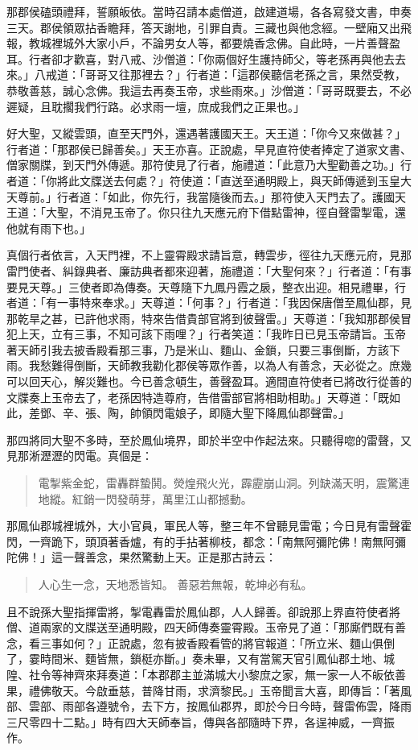 那郡侯磕頭禮拜，誓願皈依。當時召請本處僧道，啟建道場，各各寫發文書，申奏三天。郡侯領眾拈香瞻拜，答天謝地，引罪自責。三藏也與他念經。一壁廂又出飛報，教城裡城外大家小戶，不論男女人等，都要燒香念佛。自此時，一片善聲盈耳。行者卻才歡喜，對八戒、沙僧道：「你兩個好生護持師父，等老孫再與他去去來。」八戒道：「哥哥又往那裡去？」行者道：「這郡侯聽信老孫之言，果然受教，恭敬善慈，誠心念佛。我這去再奏玉帝，求些雨來。」沙僧道：「哥哥既要去，不必遲疑，且耽擱我們行路。必求雨一壇，庶成我們之正果也。」

好大聖，又縱雲頭，直至天門外，還遇著護國天王。天王道：「你今又來做甚？」行者道：「那郡侯已歸善矣。」天王亦喜。正說處，早見直符使者捧定了道家文書、僧家關牒，到天門外傳遞。那符使見了行者，施禮道：「此意乃大聖勸善之功。」行者道：「你將此文牒送去何處？」符使道：「直送至通明殿上，與天師傳遞到玉皇大天尊前。」行者道：「如此，你先行，我當隨後而去。」那符使入天門去了。護國天王道：「大聖，不消見玉帝了。你只往九天應元府下借點雷神，徑自聲雷掣電，還他就有雨下也。」

真個行者依言，入天門裡，不上靈霄殿求請旨意，轉雲步，徑往九天應元府，見那雷門使者、糾錄典者、廉訪典者都來迎著，施禮道：「大聖何來？」行者道：「有事要見天尊。」三使者即為傳奏。天尊隨下九鳳丹霞之扆，整衣出迎。相見禮畢，行者道：「有一事特來奉求。」天尊道：「何事？」行者道：「我因保唐僧至鳳仙郡，見那乾旱之甚，已許他求雨，特來告借貴部官將到彼聲雷。」天尊道：「我知那郡侯冒犯上天，立有三事，不知可該下雨哩？」行者笑道：「我昨日已見玉帝請旨。玉帝著天師引我去披香殿看那三事，乃是米山、麵山、金鎖，只要三事倒斷，方該下雨。我愁難得倒斷，天師教我勸化郡侯等眾作善，以為人有善念，天必從之。庶幾可以回天心，解災難也。今已善念頓生，善聲盈耳。適間直符使者已將改行從善的文牒奏上玉帝去了，老孫因特造尊府，告借雷部官將相助相助。」天尊道：「既如此，差鄧、辛、張、陶，帥領閃電娘子，即隨大聖下降鳳仙郡聲雷。」

那四將同大聖不多時，至於鳳仙境界，即於半空中作起法來。只聽得唿的雷聲，又見那淅瀝瀝的閃電。真個是：
\begin{quote}
電掣紫金蛇，雷轟群蟄鬨。熒煌飛火光，霹靂崩山洞。列缺滿天明，震驚連地縱。紅銷一閃發萌芽，萬里江山都撼動。
\end{quote}

那鳳仙郡城裡城外，大小官員，軍民人等，整三年不曾聽見雷電；今日見有雷聲霍閃，一齊跪下，頭頂著香爐，有的手拈著柳枝，都念：「南無阿彌陀佛！南無阿彌陀佛！」這一聲善念，果然驚動上天。正是那古詩云：
\begin{quote}
人心生一念，天地悉皆知。
善惡若無報，乾坤必有私。
\end{quote}

且不說孫大聖指揮雷將，掣電轟雷於鳳仙郡，人人歸善。卻說那上界直符使者將僧、道兩家的文牒送至通明殿，四天師傳奏靈霄殿。玉帝見了道：「那廝們既有善念，看三事如何？」正說處，忽有披香殿看管的將官報道：「所立米、麵山俱倒了，霎時間米、麵皆無，鎖梃亦斷。」奏未畢，又有當駕天官引鳳仙郡土地、城隍、社令等神齊來拜奏道：「本郡郡主並滿城大小黎庶之家，無一家一人不皈依善果，禮佛敬天。今啟垂慈，普降甘雨，求濟黎民。」玉帝聞言大喜，即傳旨：「著風部、雲部、雨部各遵號令，去下方，按鳳仙郡界，即於今日今時，聲雷佈雲，降雨三尺零四十二點。」時有四大天師奉旨，傳與各部隨時下界，各逞神威，一齊振作。

